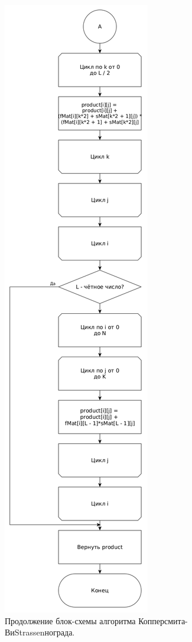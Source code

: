 \documentclass[12pt]{report}
\begin{document}
\begin{figure}
\begin{center}
\includegraphics[scale=0.29]{inc/img/WinogradPart2.png}
\captionsetup{justification=centering}
	\caption{Продолжение блок-схемы алгоритма Копперсмита-ВиStrassenнограда.}
	\label{img:Winograd2}	
\end{center}
\end{figure}
\end{document}
